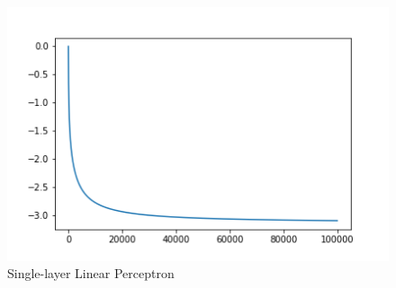 \documentclass[letter, 10pt]{article}
\begin{document}
\begin{figure}[H]
    \endminipage\hfill
        \centering
        \includegraphics[width=1.1\textwidth]{HW5/d.png}
    \endminipage\hfill
    \caption{Single-layer Linear Perceptron}
\end{figure}
\end{document}
